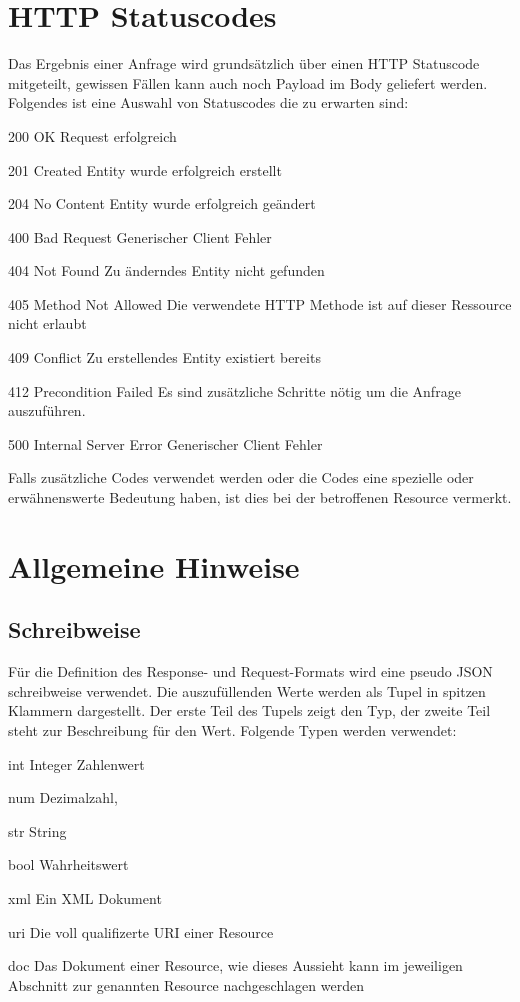 \documentclass[10pt,a4paper]{scrartcl}
\begin{document}
\pagebreak
\section{HTTP Statuscodes}
Das Ergebnis einer Anfrage wird grundsätzlich über einen HTTP Statuscode mitgeteilt, gewissen Fällen
kann auch noch Payload im Body geliefert werden. Folgendes ist eine Auswahl von Statuscodes die zu
erwarten sind:

\begin{description*}
    \item[200 OK] Request erfolgreich
	\item[201 Created] Entity wurde erfolgreich erstellt
	\item[204 No Content] Entity wurde erfolgreich geändert
	\item[400 Bad Request] Generischer Client Fehler
	\item[404 Not Found] Zu änderndes Entity nicht gefunden
	\item[405 Method Not Allowed] Die verwendete HTTP Methode ist auf dieser Ressource nicht erlaubt
	\item[409 Conflict] Zu erstellendes Entity existiert bereits
	\item[412 Precondition Failed] Es sind zusätzliche Schritte nötig um die Anfrage auszuführen.
	\item[500 Internal Server Error] Generischer Client Fehler
\end{description*}

Falls zusätzliche Codes verwendet werden oder die Codes eine spezielle oder erwähnenswerte Bedeutung haben, ist dies bei der betroffenen Resource vermerkt.


\pagebreak
\section{Allgemeine Hinweise}

\subsection{Schreibweise}
Für die Definition des Response- und Request-Formats wird eine pseudo JSON schreibweise verwendet. Die
auszufüllenden Werte werden als Tupel in spitzen Klammern dargestellt. Der erste Teil des Tupels zeigt 
den Typ, der zweite Teil steht zur Beschreibung für den Wert. Folgende Typen werden verwendet:
\begin{description*}
    \item[int] Integer Zahlenwert
    \item[num] Dezimalzahl, 
    \item[str] String
    \item[bool] Wahrheitswert
    \item[xml] Ein XML Dokument
    \item[uri] Die voll qualifizerte URI einer Resource
    \item[doc] Das Dokument einer Resource, wie dieses Aussieht kann im jeweiligen Abschnitt zur genannten Resource nachgeschlagen werden
\end{description*}
\end{document}
